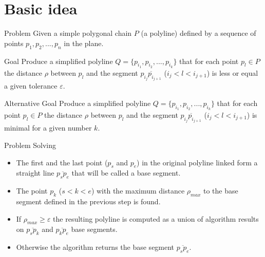 \documentclass[10pt]{beamer}
\begin{document}
\section{Basic idea}

\begin{frame}{Problem}
Given a simple polygonal chain $P$  (a polyline) defined by a sequence of points $p_{1},p_{2},...,p_{n}$ in the plane. 

\begin{alertblock}{Goal}
Produce a simplified polyline  $Q=\{p_{i_{1}},p_{i_{2}},...,p_{i_{k}}\}$
that for each point $p_{l}\in P$ the distance $\rho$ between $p_{l}$
and the segment $\overline{p_{i_{j}}p_{i_{j+1}}}$ ($i_{j} < l < i_{j+1}$) 
is less or equal a given tolerance $\varepsilon$.
\end{alertblock}

\begin{alertblock}{Alternative Goal}
Produce a simplified polyline  $Q=\{p_{i_{1}},p_{i_{2}},...,p_{i_{k}}\}$
that for each point $p_{l}\in P$ the distance $\rho$ between $p_{l}$
and the segment $\overline{p_{i_{j}}p_{i_{j+1}}}$ ($i_{j} < l < i_{j+1}$)   
is  minimal for a given number $k$.
\end{alertblock}

\end{frame}

\begin{frame}{Problem Solving}
	\begin{itemize}
		\item %
			  The first and the last point ($p_{s}$ and $p_{e}$)  in the original polyline 
			  linked form a straight line $\overline{p_sp_e}$ that will be called a \alert{base segment}.		
		\item %
			  The point $p_k$ ($s <  k < e$) with the maximum distance $\rho_{max}$ 
			  to the base segment defined in the previous step is found. 
		\item %
		      If $\rho_{max} \geq \varepsilon$ the resulting polyline is computed 
		      as a union of algorithm results on $\overline{p_{s}p_k}$ 
		      and $\overline{p_kp_{e}}$ base segments.
		\item %
			  Otherwise the algorithm returns the base segment $\overline{p_sp_e}$.
	\end{itemize}
\end{frame}
\end{document}
